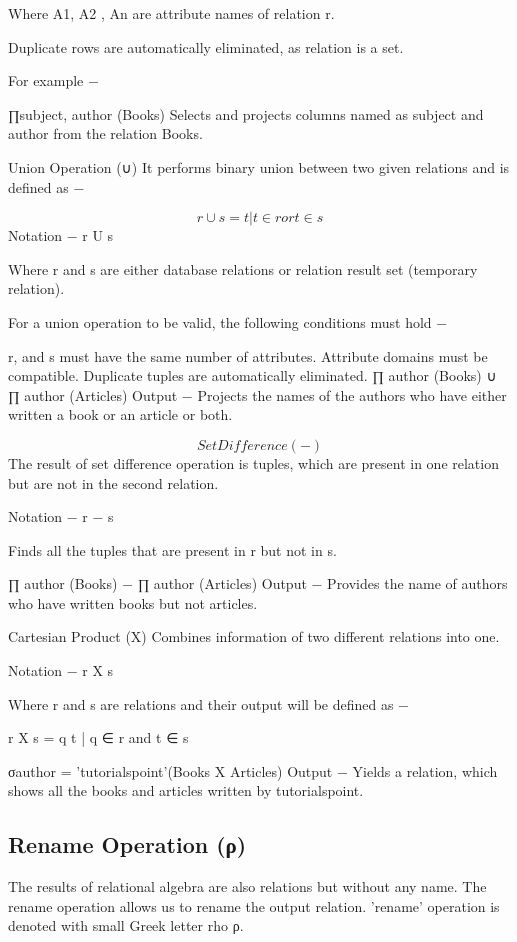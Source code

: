 Where A1, A2 , An are attribute names of relation r.

Duplicate rows are automatically eliminated, as relation is a set.

For example −

∏subject, author (Books)
Selects and projects columns named as subject and author from the relation Books.

Union Operation (∪)
It performs binary union between two given relations and is defined as −

\[r ∪ s = { t | t ∈ r or t ∈ s}\]
Notation − r U s

Where r and s are either database relations or relation result set (temporary relation).

For a union operation to be valid, the following conditions must hold −

r, and s must have the same number of attributes.
Attribute domains must be compatible.
Duplicate tuples are automatically eliminated.
∏ author (Books) ∪ ∏ author (Articles)
Output − Projects the names of the authors who have either written a book or an article or both.

\[Set Difference (−)\]
The result of set difference operation is tuples, which are present in one relation but are not in the second relation.

Notation − r − s

Finds all the tuples that are present in r but not in s.

∏ author (Books) − ∏ author (Articles)
Output − Provides the name of authors who have written books but not articles.

Cartesian Product (Χ)
Combines information of two different relations into one.

Notation − r Χ s

Where r and s are relations and their output will be defined as −

r Χ s = { q t | q ∈ r and t ∈ s}

σauthor = 'tutorialspoint'(Books Χ Articles)
Output − Yields a relation, which shows all the books and articles written by tutorialspoint.

\subsection{Rename Operation (ρ)}
The results of relational algebra are also relations but without any name. The rename operation allows us to rename the output relation. 'rename' operation is denoted with small Greek letter rho ρ.

